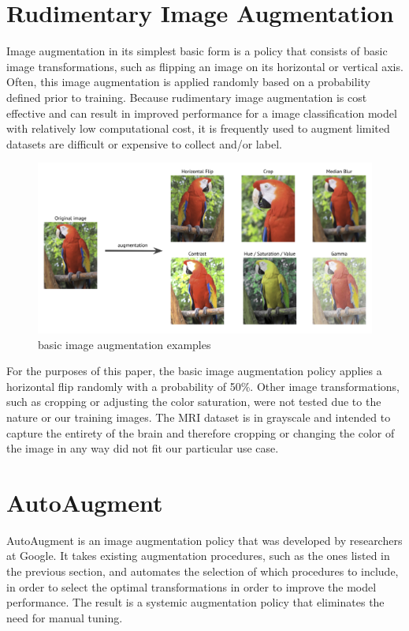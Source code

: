 \documentclass [MAS] {uclathes}
\begin{document}
\section{Rudimentary Image Augmentation}
Image augmentation in its simplest basic form is a policy that consists of basic image transformations, such as flipping
an image on its horizontal or vertical axis. Often, this image augmentation is applied randomly based on a probability 
defined prior to training. Because rudimentary image augmentation is cost effective and can result in improved 
performance for a image classification model with relatively low computational cost, it is frequently used to augment 
limited datasets are difficult or expensive to collect and/or label.

\begin{figure} [H]
    \centering
    \includegraphics[width=0.75\linewidth]{figures/basic-image-augmentation-example.png}
    \caption{basic image augmentation examples}
    \label{fig:basic image augmentation examples}
\end{figure}

For the purposes of this paper, the basic image augmentation policy applies a horizontal flip randomly with a 
probability of 50\%. Other image transformations, such as cropping or adjusting the color saturation, were not tested 
due to the nature or our training images. The MRI dataset is in grayscale and intended to capture the entirety of the 
brain and therefore cropping or changing the color of the image in any way did not fit our particular use case. 

\section{AutoAugment}
AutoAugment is an image augmentation policy that was developed by researchers at Google. It takes existing augmentation 
procedures, such as the ones listed in the previous section, and automates the selection of which procedures to include,
in order to select the optimal transformations in order to improve the model performance. The result is a systemic 
augmentation policy that eliminates the need for manual tuning. 
\end{document}
